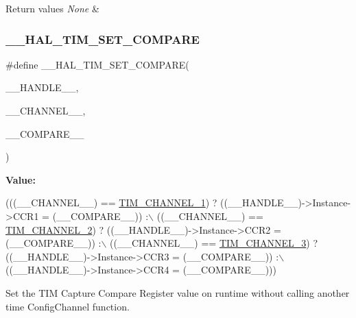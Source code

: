 \begin{DoxyRetVals}{Return values}
{\em None} & \\
\hline
\end{DoxyRetVals}
\mbox{\label{group___t_i_m___exported___macros_ga300d0c9624c3b072d3afeb7cef639b66}} 
\subsubsection{\texorpdfstring{\+\_\+\+\_\+\+H\+A\+L\+\_\+\+T\+I\+M\+\_\+\+S\+E\+T\+\_\+\+C\+O\+M\+P\+A\+RE}{\_\_HAL\_TIM\_SET\_COMPARE}}
{\footnotesize\ttfamily \#define \+\_\+\+\_\+\+H\+A\+L\+\_\+\+T\+I\+M\+\_\+\+S\+E\+T\+\_\+\+C\+O\+M\+P\+A\+RE(\begin{DoxyParamCaption}\item[{}]{\+\_\+\+\_\+\+H\+A\+N\+D\+L\+E\+\_\+\+\_\+,  }\item[{}]{\+\_\+\+\_\+\+C\+H\+A\+N\+N\+E\+L\+\_\+\+\_\+,  }\item[{}]{\+\_\+\+\_\+\+C\+O\+M\+P\+A\+R\+E\+\_\+\+\_\+ }\end{DoxyParamCaption})}

{\bfseries Value\+:}
\begin{DoxyCode}
(((\_\_CHANNEL\_\_) == \hyperlink{group___t_i_m___channel_ga6b1541e4a49d62610899e24bf23f4879}{TIM\_CHANNEL\_1}) ? ((\_\_HANDLE\_\_)->Instance->CCR1 = (\_\_COMPARE\_\_)) :\(\backslash\)
 ((\_\_CHANNEL\_\_) == \hyperlink{group___t_i_m___channel_ga33e02d43345a7ac5886f01b39e4f7ccd}{TIM\_CHANNEL\_2}) ? ((\_\_HANDLE\_\_)->Instance->CCR2 = (\_\_COMPARE\_\_)) :\(\backslash\)
 ((\_\_CHANNEL\_\_) == \hyperlink{group___t_i_m___channel_ga4ea100c1789b178f3cb46721b7257e2d}{TIM\_CHANNEL\_3}) ? ((\_\_HANDLE\_\_)->Instance->CCR3 = (\_\_COMPARE\_\_)) :\(\backslash\)
 ((\_\_HANDLE\_\_)->Instance->CCR4 = (\_\_COMPARE\_\_)))
\end{DoxyCode}


Set the T\+IM Capture Compare Register value on runtime without calling another time Config\+Channel function. 


